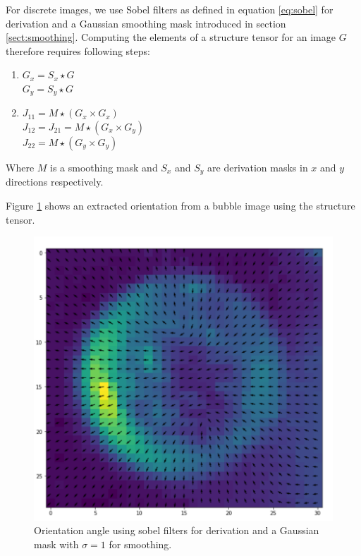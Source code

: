 		For discrete images, we use Sobel filters as defined in equation \ref{eq:sobel} for derivation and a Gaussian smoothing mask introduced in section \ref{sect:smoothing}. Computing the elements of a structure tensor for an image $G$ therefore requires following steps:
		\begin{enumerate}
			\item $G_x = S_x \star G$ \\
						$G_y = S_y \star G$
			\item $J_{11} = M \star (G_x \times G_x)$ \\
						 $J_{12} = J_{21} = M \star (G_x \times G_y)$ \\
						 $J_{22} = M \star (G_y \times G_y)$
		\end{enumerate}
		Where $M$ is a smoothing mask and $S_x$ and $S_y$ are derivation masks in $x$ and $y$ directions respectively.

		Figure \ref{fig:struct_tensor_demo} shows an extracted orientation from a bubble image using the structure tensor.
		\begin{figure}
			\centering
			\includegraphics[scale=0.4]{images/structure_tensor_demo.png}
			\caption{Orientation angle using sobel filters for derivation and a Gaussian mask with $\sigma =1$ for smoothing.}
			\label{fig:struct_tensor_demo}
		\end{figure}
		
